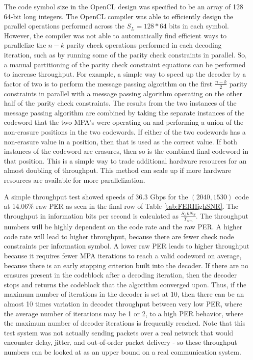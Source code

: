 \documentclass[conference]{IEEEtran}
\begin{document}
The code symbol size in the OpenCL design was specified to be an array of 128 64-bit long integers.  The OpenCL compiler was able to efficiently design the parallel operations performed across the $S_L=128*64$ bits in each symbol. However, the compiler was not able to automatically find efficient ways to parallelize the $n-k$ parity check operations performed in each decoding iteration, such as by running some of the parity check constraints in parallel.  So, a manual partitioning of the parity check constraint equations can be performed to increase throughput.  For example, a simple way to speed up the decoder by a factor of two is to perform the message passing algorithm on the first $\frac{n-k}{2}$ parity constraints in parallel with a message passing algorithm operating on the other half of the parity check constraints.  The results from the two instances of the message passing algorithm are combined by taking the separate instances of the codeword that the two MPA's were operating on and performing a union of the non-erasure positions in the two codewords.  If either of the two codewords has a non-erasure value in a position, then that is used as the correct value.  If both instances of the codeword are erasures, then so is the combined final codeword in that position.  This is a simple way to trade additional hardware resources for an almost doubling of throughput.  This method can scale up if more hardware resources are available for more parallelization.

A simple throughput test showed speeds of 36.3 Gbps for the $(2040, 1530)$ code at 14.06\% raw PER as seen in the final row of Table \ref{tab:FERHighSNR}. The throughput in information bits per second is calculated as $\frac{S_L k N_T}{T_{sim}}$. The throughput numbers will be highly dependent on the code rate and the raw PER.  A higher code rate will lead to higher throughput, because there are fewer check node constraints per information symbol.  A lower raw PER leads to higher throughput because it requires fewer MPA iterations to reach a valid codeword on average, because there is an early stopping criterion built into the decoder.  If there are no erasures present in the codeblock after a decoding iteration, then the decoder stops and returns the codeblock that the algorithm converged upon.  Thus, if the maximum number of iterations in the decoder is set at 10, then there can be an almost 10 times variation in decoder throughput between very low PER, where the average number of iterations may be 1 or 2, to a high PER behavior, where the maximum number of decoder iterations is frequently reached.  Note that this test system was not actually sending packets over a real network that would encounter delay, jitter, and out-of-order packet delivery - so these throughput numbers can be looked at as an upper bound on a real communication system.  
\end{document}

